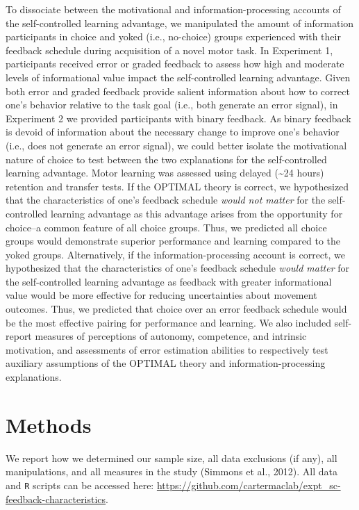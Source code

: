 \documentclass[
  doc, donotrepeattitle,floatsintext]{apa7}
\begin{document}
To dissociate between the motivational and information-processing accounts of the self-controlled learning advantage, we manipulated the amount of information participants in choice and yoked (i.e., no-choice) groups experienced with their feedback schedule during acquisition of a novel motor task. In Experiment 1, participants received error or graded feedback to assess how high and moderate levels of informational value impact the self-controlled learning advantage. Given both error and graded feedback provide salient information about how to correct one's behavior relative to the task goal (i.e., both generate an error signal), in Experiment 2 we provided participants with binary feedback. As binary feedback is devoid of information about the necessary change to improve one's behavior (i.e., does not generate an error signal), we could better isolate the motivational nature of choice to test between the two explanations for the self-controlled learning advantage. Motor learning was assessed using delayed (\textasciitilde24 hours) retention and transfer tests. If the OPTIMAL theory is correct, we hypothesized that the characteristics of one's feedback schedule \emph{would not matter} for the self-controlled learning advantage as this advantage arises from the opportunity for choice--a common feature of all choice groups. Thus, we predicted all choice groups would demonstrate superior performance and learning compared to the yoked groups. Alternatively, if the information-processing account is correct, we hypothesized that the characteristics of one's feedback schedule \emph{would matter} for the self-controlled learning advantage as feedback with greater informational value would be more effective for reducing uncertainties about movement outcomes. Thus, we predicted that choice over an error feedback schedule would be the most effective pairing for performance and learning. We also included self-report measures of perceptions of autonomy, competence, and intrinsic motivation, and assessments of error estimation abilities to respectively test auxiliary assumptions of the OPTIMAL theory and information-processing explanations.

\hypertarget{methods}{%
\section{Methods}\label{methods}}

We report how we determined our sample size, all data exclusions (if any), all manipulations, and all measures in the study (Simmons et al., 2012). All data and \texttt{R} scripts can be accessed here: \url{https://github.com/cartermaclab/expt_sc-feedback-characteristics}.
\end{document}
